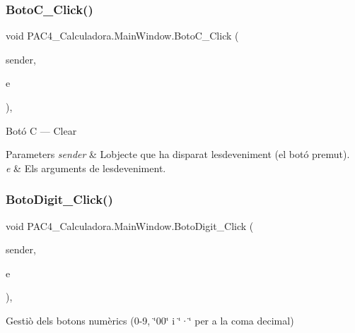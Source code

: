 \subsubsection{\texorpdfstring{Boto\+C\+\_\+\+Click()}{BotoC\_Click()}}
{\footnotesize\ttfamily void P\+A\+C4\+\_\+\+Calculadora.\+Main\+Window.\+Boto\+C\+\_\+\+Click (\begin{DoxyParamCaption}\item[{object}]{sender,  }\item[{Routed\+Event\+Args}]{e }\end{DoxyParamCaption})\hspace{0.3cm}{\ttfamily [inline]}, {\ttfamily [private]}}



Botó C — Clear 


\begin{DoxyParams}{Parameters}
{\em sender} & L\textquotesingle{}objecte que ha disparat l\textquotesingle{}esdeveniment (el botó premut).\\
\hline
{\em e} & Els arguments de l\textquotesingle{}esdeveniment.\\
\hline
\end{DoxyParams}
\mbox{\label{class_p_a_c4___calculadora_1_1_main_window_a1d10dfb25aa5485ccb3e129cb4b28994}} 
\subsubsection{\texorpdfstring{Boto\+Digit\+\_\+\+Click()}{BotoDigit\_Click()}}
{\footnotesize\ttfamily void P\+A\+C4\+\_\+\+Calculadora.\+Main\+Window.\+Boto\+Digit\+\_\+\+Click (\begin{DoxyParamCaption}\item[{object}]{sender,  }\item[{Routed\+Event\+Args}]{e }\end{DoxyParamCaption})\hspace{0.3cm}{\ttfamily [inline]}, {\ttfamily [private]}}



Gestiò dels botons numèrics (0-\/9, \char`\"{}00\char`\"{} i \char`\"{}·\char`\"{} per a la coma decimal) 


